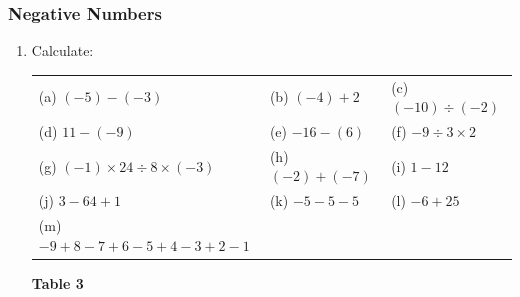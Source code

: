             \subsubsection{  Negative Numbers }
            \nopagebreak
          \label{m38346*id175300}\begin{enumerate}[noitemsep, label=\textbf{\arabic*}. ] 
            \label{m38346*uid33}\item Calculate:
          \begin{table}
        \begin{center}
      \label{m38346*id175316}
    \noindent
      \tablelasttail{}
      \begin{xtabular}[t]{|l|l|l|}\hline
        (a) $\left(-5\right)-\left(-3\right)$ &
        (b) $\left(-4\right)+2$ &
        (c) $\left(-10\right)÷\left(-2\right)$%
     \tabularnewline{}
        (d) $11-\left(-9\right)$ &
        (e) $-16-\left(6\right)$ &
        (f) $-9÷3\ensuremath{\times}2$%
     \tabularnewline{}
        (g) $\left(-1\right)\ensuremath{\times}24÷8\ensuremath{\times}\left(-3\right)$ &
        (h) $\left(-2\right)+\left(-7\right)$ &
        (i) $1-12$%
     \tabularnewline{}
        (j) $3-64+1$ &
        (k) $-5-5-5$ &
        (l) $-6+25$%
     \tabularnewline{}
        (m) $-9+8-7+6-5+4-3+2-1$ &
         &
     \tabularnewline{}
    \end{xtabular}
      \end{center}
    \begin{center}{\small\bfseries Table 3}\end{center}

\end{table}
\end{enumerate}

